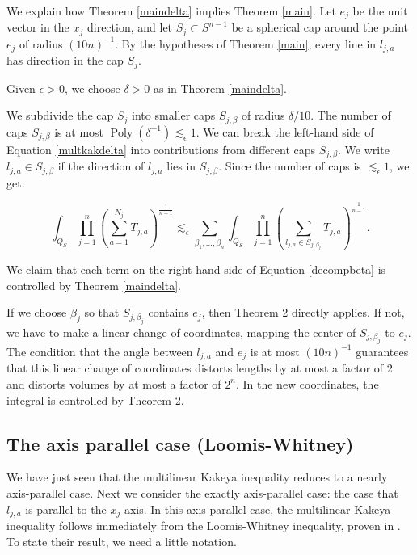 \documentclass{amsart}
\DeclareMathOperator{\Poly}{Poly}
\newcommand{\eps}{\epsilon}
\begin{document}
We explain how Theorem \ref{maindelta} implies Theorem \ref{main}.  Let $e_j$ be the unit vector in the $x_j$ direction, and let $S_j \subset S^{n-1}$ be a spherical cap around the point $e_j$ of radius $(10 n)^{-1}$.  By the hypotheses of Theorem \ref{main}, every line in $l_{j,a}$ has direction in the cap $S_j$.  

Given $\eps > 0$, we choose $\delta > 0$ as in Theorem \ref{maindelta}.

We subdivide the cap $S_j$ into smaller caps $S_{j, \beta}$ of radius $\delta/10$.  The number of caps $S_{j, \beta}$ is at most $\Poly(\delta^{-1}) \lesssim_\eps 1$.  We can break the left-hand side of Equation \ref{multkakdelta} into contributions from different caps $S_{j, \beta}$.  We write $l_{j,a} \in S_{j, \beta}$ if the direction of $l_{j,a}$ lies in $S_{j, \beta}$.  Since the number of caps is $\lesssim_\eps 1$, we get:

\begin{equation}  \label{decompbeta}  \int_{Q_S} \prod_{j=1}^n \left( \sum_{a = 1}^{N_j}  T_{j,a} \right)^{\frac{1}{n-1}} \lesssim_\eps 
\sum_{\beta_1, ..., \beta_n} \int_{Q_S} \prod_{j=1}^n \left( \sum_{l_{j,a} \in S_{j, \beta_j}}  T_{j,a} \right)^{\frac{1}{n-1}}. \end{equation}

We claim that each term on the right hand side of Equation \ref{decompbeta} is controlled by Theorem \ref{maindelta}.

If we choose $\beta_j$ so that $S_{j, \beta_j}$ contains $e_j$, then Theorem 2 directly applies.  If not, we have to make a linear change of coordinates, mapping the center of $S_{j, \beta_j}$ to $e_j$.  The condition that the angle between $l_{j,a}$ and $e_j$ is at most $(10 n)^{-1}$ guarantees that this linear change of coordinates distorts lengths by at most a factor of 2 and distorts volumes by at most a factor of $2^n$.  In the new coordinates, the integral is controlled by Theorem 2.

\subsection{The axis parallel case (Loomis-Whitney)}  \label{subsecaxispar}

We have just seen that the multilinear Kakeya inequality reduces to a nearly axis-parallel case.  Next we consider the exactly axis-parallel case: the case that $l_{j,a}$ is parallel to the $x_j$-axis.  In this axis-parallel case, the multilinear Kakeya inequality follows immediately from the Loomis-Whitney inequality, proven in \cite{LW}.  To state their result, we need a little notation.
\end{document}
